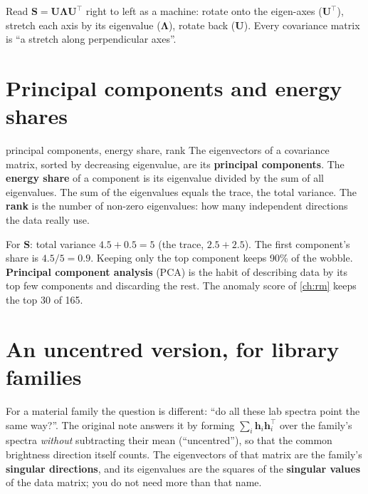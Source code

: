 \documentclass[11pt,a4paper,oneside,openany]{book}
\newcommand{\B}[1]{{\symbf{#1}}}
\newcommand{\B}[1]{{\bm{#1}}}
\newcommand{\T}{^{\top}}
\newcommand{\vh}{\B{h}}
\newcommand{\mS}{\B{S}}
\newcommand{\mU}{\B{U}}
\newcommand{\mLam}{\B{\Lambda}}
\begin{document}
Read $\mS=\mU\mLam\mU\T$ right to left as a machine: rotate onto the eigen-axes ($\mU\T$), stretch each axis by its eigenvalue
($\mLam$), rotate back ($\mU$). Every covariance matrix is ``a stretch along perpendicular axes''.

\section{Principal components and energy shares}

\begin{defn}{principal components, energy share, rank}
The eigenvectors of a covariance matrix, sorted by decreasing eigenvalue, are its \textbf{principal components}. The
\textbf{energy share} of a component is its eigenvalue divided by the sum of all eigenvalues. The sum of the eigenvalues equals
the trace, the total variance. The \textbf{rank} is the number of non-zero eigenvalues: how many independent directions the
data really use.
\end{defn}

For $\mS$: total variance $4.5+0.5=5$ (the trace, $2.5+2.5$). The first component's share is $4.5/5=0.9$. Keeping only the top
component keeps 90\% of the wobble. \textbf{Principal component analysis} (PCA) is the habit of describing data by its top few
components and discarding the rest. The anomaly score of \cref{ch:rm} keeps the top 30 of 165.

\section{An uncentred version, for library families}

For a material family the question is different: ``do all these lab spectra point the same way?''. The original note answers
it by forming $\sum_i\vh_i\vh_i\T$ over the family's spectra \emph{without} subtracting their mean (``uncentred''), so that the
common brightness direction itself counts. The eigenvectors of that matrix are the family's \textbf{singular directions}, and
its eigenvalues are the squares of the \textbf{singular values} of the data matrix; you do not need more than that name.
\end{document}
